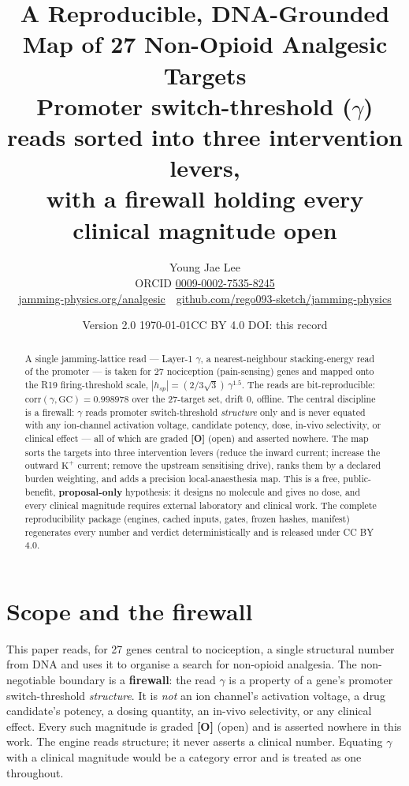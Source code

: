 \documentclass[11pt]{article}
\title{\textbf{A Reproducible, DNA-Grounded Map of 27 Non-Opioid Analgesic Targets}\\[2pt]
\large Promoter switch-threshold ($\gamma$) reads sorted into three intervention levers,\\ with a firewall holding every clinical magnitude open}
\author{Young Jae Lee\\ \small ORCID \href{https://orcid.org/0009-0002-7535-8245}{0009-0002-7535-8245}\\
\small \href{https://jamming-physics.org/analgesic/}{jamming-physics.org/analgesic}\ \textbar\ \href{https://github.com/rego093-sketch/jamming-physics}{github.com/rego093-sketch/jamming-physics}}
\date{Version 2.0 \quad\textbullet\quad \today \quad\textbullet\quad CC BY 4.0 \quad\textbullet\quad DOI: this record}
\newcommand{\gO}{\textcolor{go}{\textbf{[O]}}}
\begin{document}
\maketitle
\thispagestyle{empty}

\begin{center}\end{center}

\begin{abstract}\noindent A single jamming-lattice read --- Layer-1 $\gamma$, a nearest-neighbour stacking-energy read of the promoter --- is taken for 27 nociception (pain-sensing) genes and mapped onto the R19 firing-threshold scale, $|h_{sp}| = (2/3\sqrt{3})\,\gamma^{1.5}$. The reads are bit-reproducible: $\mathrm{corr}(\gamma,\mathrm{GC})=0.998978$ over the 27-target set, drift $0$, offline. The central discipline is a firewall: $\gamma$ reads promoter switch-threshold \emph{structure} only and is never equated with any ion-channel activation voltage, candidate potency, dose, in-vivo selectivity, or clinical effect --- all of which are graded \gO{} (open) and asserted nowhere. The map sorts the targets into three intervention levers (reduce the inward current; increase the outward $\mathrm{K^+}$ current; remove the upstream sensitising drive), ranks them by a declared burden weighting, and adds a precision local-anaesthesia map. This is a free, public-benefit, \textbf{proposal-only} hypothesis: it designs no molecule and gives no dose, and every clinical magnitude requires external laboratory and clinical work. The complete reproducibility package (engines, cached inputs, gates, frozen hashes, manifest) regenerates every number and verdict deterministically and is released under CC BY 4.0.\end{abstract}

\section{Scope and the firewall}
This paper reads, for 27 genes central to nociception, a single structural number from DNA and uses it to organise a search for non-opioid analgesia. The non-negotiable boundary is a \textbf{firewall}: the read $\gamma$ is a property of a gene's promoter switch-threshold \emph{structure}. It is \emph{not} an ion channel's activation voltage, a drug candidate's potency, a dosing quantity, an in-vivo selectivity, or any clinical effect. Every such magnitude is graded \gO{} (open) and is asserted nowhere in this work. The engine reads structure; it never asserts a clinical number. Equating $\gamma$ with a clinical magnitude would be a category error and is treated as one throughout.
\end{document}
